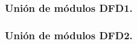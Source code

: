 \documentclass[12pt,a4paper]{article}
\begin{document}
\subsubsection{Unión de módulos DFD1.}
\begin{center}
\end{center}
\subsubsection{Unión de módulos DFD2.}
\begin{center}
\end{center}
\end{document}

